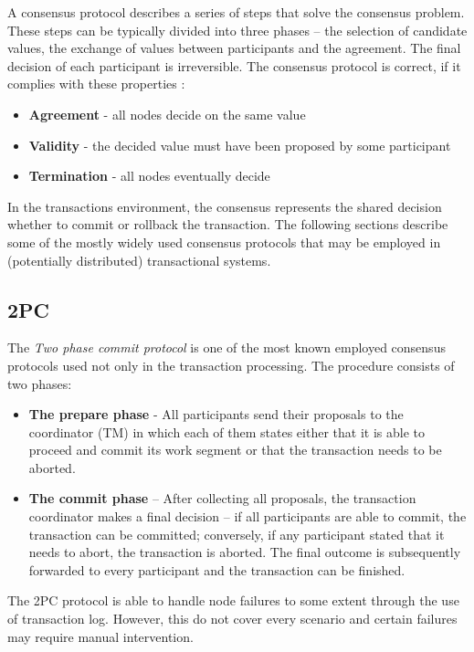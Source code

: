 \documentclass[oneside,
  digital, %
  table,   %
  nolof,     %
  nolot,     %
]{fithesis3}
\begin{document}
A consensus protocol describes a series of steps that solve the consensus problem. These steps can be typically divided into three phases -- the selection of candidate values, the exchange of values between participants and the agreement. The final decision of each participant is irreversible. The consensus protocol is correct, if it complies with these properties \cite{2PC}:

\begin{itemize}
    \item \textbf{Agreement} - all nodes decide on the same value
    \item \textbf{Validity} - the decided value must have been proposed by some participant
    \item \textbf{Termination} - all nodes eventually decide
\end{itemize}


In the transactions environment, the consensus represents the shared decision whether to commit or rollback the transaction. The following sections describe some of the mostly widely used consensus protocols that may be employed in (potentially distributed) transactional systems.

\subsection{2PC}

The \textit{Two phase commit protocol} is one of the most known employed consensus protocols used not only in the transaction processing. The procedure consists of two phases:

\begin{itemize}
    \item \textbf{The prepare phase} - All participants send their proposals to the coordinator (TM) in which each of them states either that it is able to proceed and commit its work segment or that the transaction needs to be aborted.
    
    \item \textbf{The commit phase} -- After collecting all proposals, the transaction coordinator makes a final decision -- if all participants are able to commit, the transaction can be committed; conversely, if any participant stated that it needs to abort, the transaction is aborted. The final outcome is subsequently forwarded to every participant and the transaction can be finished.
\end{itemize}

The 2PC protocol is able to handle node failures to some extent through the use of transaction log. However, this do not cover every scenario and certain failures may require manual intervention.
\end{document}

